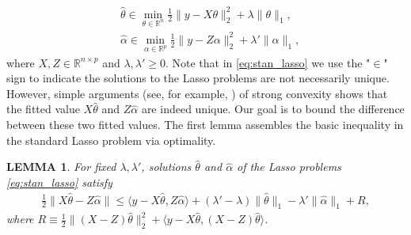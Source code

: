 \documentclass[a4paper]{article}
\newtheorem{lemma}{LEMMA}
\newcommand{\RR}{\mathbb{R}}
\begin{document}
\begin{equation}
\begin{aligned}
&\hat{\theta} \in \min_{\theta\in\RR^n} \frac{1}{2}\|y-X\theta\|_2^2 + \lambda\|\theta\|_1,\\
&\hat{\alpha} \in \min_{\alpha\in\RR^p} \frac{1}{2}\|y-Z\alpha\|_2^2 + \lambda'\|\alpha\|_1,
\end{aligned}
\label{eq:stan_lasso}
\end{equation}
where $X,Z\in\RR^{n\times p}$ and $\lambda,\lambda'\geq 0$. Note that in \eqref{eq:stan_lasso} we use the "$\in$" sign to indicate the solutions to the  Lasso problems are not necessarily unique. However, simple arguments (see, for example, \cite{tibshirani2013lasso}) of strong convexity shows that the fitted value $X\hat{\theta}$ and $Z\hat{\alpha}$ are indeed unique. Our goal is to bound the difference between these two fitted values. The first lemma assembles the basic inequality in the standard Lasso problem via optimality.

\begin{lemma}
For fixed $\lambda, \lambda'$, solutions $\hat{\theta}$ and $\hat{\alpha}$ of the Lasso problems \eqref{eq:stan_lasso} satisfy
\begin{align*}
\frac{1}{2}\|X\hat{\theta} - Z\hat{\alpha}\| \leq \langle y-X\hat{\theta}, Z\hat{\alpha}\rangle + (\lambda'-\lambda)\|\hat{\theta}\|_1 - \lambda'\|\hat{\alpha}\|_1 + R,
\end{align*}
where $R \equiv \frac{1}{2}\|(X-Z)\hat{\theta}\|_2^2 + \langle y-X\hat{\theta}, (X-Z)\hat{\theta}\rangle$.
\label{lemma:lemma_1}
\end{lemma}
\end{document}
